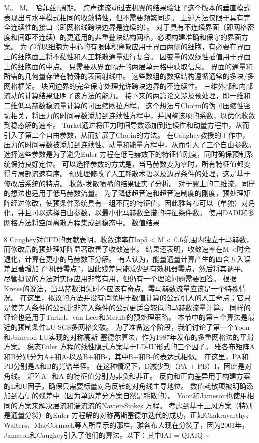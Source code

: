 \documentclass[UTF8,11pt,a4paper,openany,fontset=fandol]{ctexbook}
\begin{document}
M。 M。 哈菲兹7周期。 跨声速流动过去机翼的结果验证了这个版本的垂直模式表现出与水平模式相同的收敛特性，但不需要频繁同步。 上述方法仅限于具有完全连续性的接口（即网格线跨块边界是连续的）。 对于具有不连续界面（即网格密度和间距不连续）的更通用的非重叠块结构网格，必须构建准确和保守的界面方案。 为了将以细胞为中心的有限体积离散应用于界面两侧的细胞，有必要在界面上的细胞面上将不黏性和人工耗散通量进行复合。 因变量的双线性插值用于界面上的细胞面的中点。 只需要从界面隔开的两层单元格中获取信息。 界面的通量和所需的几何量存储在特殊的表面射线中。 这些数组的数据结构遵循通常的多块/多网格框架。 块间边界的完全保守处理允许跨块边界的不连续性。 三维外部和内部流动的计算结果证明了该方法的能力。 接下来的两篇论文涉及预处理，即一维和二维低马赫数稳流量计算的可压缩欧拉方程。 这个想法与Chorin的伪可压缩性密切相关，将压力的时间导数添加到连续性方程中，并调整该项的系数，以优化收敛到稳态解的速率。 Turkel通过将压力时间导数添加到连续性和动量方程中，从而引入了第二个自由参数，从而扩展了Chorin的方法。 在Caughey教授的工作中，压力的时间导数被添加到连续性、动量和能量方程中，从而引入了三个自由参数。 选择这些参数是为了避免Euler 方程在低马赫数下的特征值刚度，同时确保预制系统保持良好定位。 可以选择参数的方式是，当马赫数变为零时，所有特征值都变得与局部流速有序。 预处理修改了人工耗散术语以及边界条件的处理，这是基于修改后系统的特点。 收敛-发散喷嘴的结果证实了分析。 对于翼上的二维流，同样的想法也适用于低马赫数流量。 为了降低超音速和超音速制度的刚度，预处理矩阵经过修改，使预条件系统具有一组不同的特征值，因此雅各布可以（单独）对角化，并且可以选择自由参数，以最小化马赫数全谱的特征条件数。 使用DADI和多网格方法将空间离散方程集成到稳态中。 数值结果

8 Caughey对CFD的贡献表明，收敛速率在lop5 < M < 0.6范围内独立于马赫数，而修改后的预处理矩阵显著改善了收敛速率。 结果还表明，收敛速率在M <时会退化，计算在更小的马赫数下分解。 有人认为，能量通量计算产生的四舍五入误差显著增加了“机器零点”，因此残差只能减少到有效机器零点，然后将其调平。 尽管拟议的方法对实际应用非常有用，但仍有一个理论问题需要回答。 根据Kreiss的说法，当马赫数消失时不应该有奇点，零马赫数流量应该是一个特殊情况。 在这里，拟议的方法并没有消除用于数值计算的公式引入的人工奇点；它只是使先入条件的公式比非先入条件的公式更适合较低的马赫数流量计算。 同样的评论也适用于Turkel、van Leer和Merkle的预处理策略。 本节中的第三个算法是最近的预制条件LU-SGS多网格突破。 为了准备这个阶段，我们讨论了第一个Yoon和Jameson LU实现的对称高斯-塞德尔算法，作为1987年发布的多重网格法的平滑方案。 稳态Euler 方程的线性隐式方案基于LD-IU形式的三个因子。 雅各布矩阵A和B分别分为A+和A-以及B+和B-，其中B+和B-的表达式相似。 在这里，PA和PB分别是A和B的光谱半径。 在这种情况下，D减少到（PA + PB）I，因此是对角线。 矩阵A+和A-的特征值分别为非负和非正。 反向和正向差异用于构建方案的L和U因子，确保只需要标量对角反转的对角线主导地位。 数值耗散项被明确添加到右侧的残差中（因为单边差分方案自然是耗散的）。 Yoon和Jameson也使用相同的方案来解决层流和湍流流的Navier-Stokes 方程。 考虑到基于上风方案（特别是通量分裂）的Euler 方程解的对称高斯塞德尔迭代的成功，正如Chakravarthy、Walters、MacCormack等人所显示的那样，雅各布人现在分裂了，因为2001年，Jameson和Caughey引入了他们的算法。以下：其中IAI = QIAIQ-\textasciitilde{}
\end{document}
